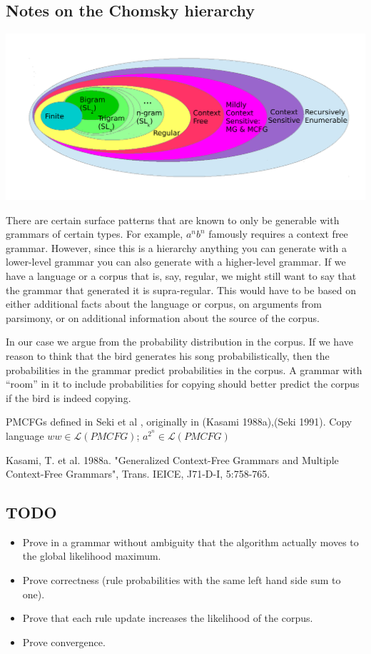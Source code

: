 \documentclass[12pt]{article}
\theoremstyle{definition}
\begin{document}
\subsection{Notes on the Chomsky hierarchy}
\label{sec:notes-chomsky-hier}

\includegraphics[width=6in]{Chomsky-hierarchy.pdf}

There are certain surface patterns that are known to only be generable with grammars of certain types. For example, $a^nb^n$ famously requires a context free grammar. However, since this is a hierarchy anything you can generate with a lower-level grammar you can also generate with a higher-level grammar. If we have a language or a corpus that is, say, regular, we might still want to say that the grammar that generated it is supra-regular. This would have to be based on either additional facts about the language or corpus, on arguments from parsimony, or on additional information about the source of the corpus. 

In our case we argue from the probability distribution in the corpus. If we have reason to think that the bird generates his song probabilistically, then the probabilities in the grammar predict probabilities in the corpus. A grammar with ``room'' in it to include probabilities for copying should better predict the corpus if the bird is indeed copying.

PMCFGs defined in Seki et al , originally in (Kasami 1988a),(Seki 1991). Copy language $ww\in \mathcal{L}(PMCFG)$; $a^{2^n}\in \mathcal{L}(PMCFG)$

Kasami, T. et al. 1988a. "Generalized Context-Free Grammars and Multiple Context-Free Grammars", Trans. IEICE, J71-D-I, 5:758-765. 


\subsection{TODO}
\begin{itemize}
\item Prove in a grammar without ambiguity that the algorithm actually moves to the global likelihood maximum.
\item Prove correctness (rule probabilities with the same left hand side sum to one).
\item Prove that each rule update increases the likelihood of the corpus.
\item Prove convergence.
\end{itemize}
\end{document}
